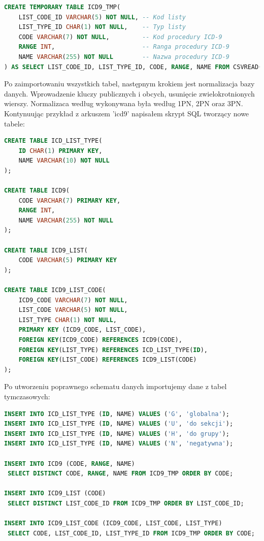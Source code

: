 \begin{lstlisting}[language=SQL]
CREATE TEMPORARY TABLE ICD9_TMP(
    LIST_CODE_ID VARCHAR(5) NOT NULL, -- Kod listy
    LIST_TYPE_ID CHAR(1) NOT NULL,    -- Typ listy
    CODE VARCHAR(7) NOT NULL,         -- Kod procedury ICD-9
    RANGE INT,                        -- Ranga procedury ICD-9
    NAME VARCHAR(255) NOT NULL        -- Nazwa procedury ICD-9
) AS SELECT LIST_CODE_ID, LIST_TYPE_ID, CODE, RANGE, NAME FROM CSVREAD('icd9.csv');
\end{lstlisting}

Po zaimportowaniu wszystkich tabel, następnym krokiem jest normalizacja bazy danych. Wprowadzenie kluczy publicznych i obcych, usunięcie zwielokrotnionych wierszy. Normalizaca według wykonywana była według 1PN, 2PN oraz 3PN. Kontynuując przykład z arkuszem 'icd9' napisałem skrypt SQL tworzący nowe tabele:

\begin{lstlisting}[language=SQL]
CREATE TABLE ICD_LIST_TYPE(
    ID CHAR(1) PRIMARY KEY,
    NAME VARCHAR(10) NOT NULL
);

CREATE TABLE ICD9(
    CODE VARCHAR(7) PRIMARY KEY,
    RANGE INT,
    NAME VARCHAR(255) NOT NULL
);

CREATE TABLE ICD9_LIST(
    CODE VARCHAR(5) PRIMARY KEY
);

CREATE TABLE ICD9_LIST_CODE(
    ICD9_CODE VARCHAR(7) NOT NULL,
    LIST_CODE VARCHAR(5) NOT NULL,
    LIST_TYPE CHAR(1) NOT NULL,
    PRIMARY KEY (ICD9_CODE, LIST_CODE),
    FOREIGN KEY(ICD9_CODE) REFERENCES ICD9(CODE),
    FOREIGN KEY(LIST_TYPE) REFERENCES ICD_LIST_TYPE(ID),
    FOREIGN KEY(LIST_CODE) REFERENCES ICD9_LIST(CODE)
);
\end{lstlisting}

Po utworzeniu poprawnego schematu danych importujemy dane z tabel tymczasowych:

\begin{lstlisting}[language=SQL]
INSERT INTO ICD_LIST_TYPE (ID, NAME) VALUES ('G', 'globalna');
INSERT INTO ICD_LIST_TYPE (ID, NAME) VALUES ('U', 'do sekcji');
INSERT INTO ICD_LIST_TYPE (ID, NAME) VALUES ('H', 'do grupy');
INSERT INTO ICD_LIST_TYPE (ID, NAME) VALUES ('N', 'negatywna');

INSERT INTO ICD9 (CODE, RANGE, NAME)
 SELECT DISTINCT CODE, RANGE, NAME FROM ICD9_TMP ORDER BY CODE;

INSERT INTO ICD9_LIST (CODE)
 SELECT DISTINCT LIST_CODE_ID FROM ICD9_TMP ORDER BY LIST_CODE_ID;

INSERT INTO ICD9_LIST_CODE (ICD9_CODE, LIST_CODE, LIST_TYPE)
 SELECT CODE, LIST_CODE_ID, LIST_TYPE_ID FROM ICD9_TMP ORDER BY CODE;
\end{lstlisting}

